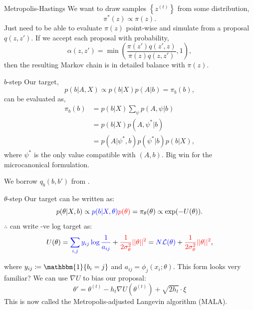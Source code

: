 \documentclass{beamer}
\newcommand{\Lcal}{\mathcal{L}}
\newcommand{\one}{\mathbbm{1}}
\begin{document}
	\begin{frame}{Metropolis-Hastings \cite{hastings-alg}}
		We want to draw samples $\left\{ z^{(t)} \right\}$ from some distribution,
		$$\pi^*(z) \propto \pi(z).$$
		Just need to be able to evaluate $\pi(z)$ point-wise and simulate from a proposal $q(z, z')$. If we accept each proposal with probability,
		$$\alpha(z, z') = \min \left( \frac{\pi(z') q(z', z)}{\pi(z) q(z, z')} , 1 \right),$$
		then the resulting Markov chain is in detailed balance with $\pi(z)$.
	\end{frame}
	
	\begin{frame}{$b$-step}
		Our target,
		$$p(b | A, X) \propto p(b | X) p(A | b) = \pi_b(b),$$
		can be evaluated as,
		\begin{align*}
			\pi_b(b) &= p(b|X) \sum_{\psi} p(A, \psi|b) \\
			&= p(b|X) p(A, \psi^* | b) \\
			&= p(A|\psi^*, b) p(\psi^*|b) p(b | X),
		\end{align*}
		where $\psi^*$ is the only value compatible with $(A,b)$. Big win for the microcanonical formulation.
		
		We borrow $q_b(b, b')$ from \citet{Peixoto-Bayesian-Microcanonical}.
	\end{frame}
	
	\begin{frame}{$\theta$-step}
		Our target can be written as:
		$$p(\theta | X, b) \propto
		{\color{blue} p(b |X, \theta)} 
		{\color{red}p(\theta)}
		= \pi_\theta(\theta) \propto \exp(-U(\theta)).$$
		$\therefore$ can write -ve log target as:
		$$U(\theta) 
		= {\color{blue} \sum_{i,j} y_{ij} \log \frac{1}{a_{ij}} } + 
		{\color{red} \frac{1}{2\sigma_\theta^2} || \theta ||^2} 
		= {\color{blue} N \Lcal(\theta)} 
		+ {\color{red} \frac{1}{2\sigma_\theta^2} ||\theta||^2 },$$
		
		where $y_{ij} \coloneqq \one \{b_i = j\}$ and $a_{ij} = \phi_{j}(x_i; \theta)$. This form looks very familiar? We can use $\nabla U$ to bias our proposal:
		$$\theta' = \theta^{(t)} - h_t \nabla U \left(\theta^{(t)} \right) + \sqrt{2h_t} \cdot \xi$$
		This is now called the Metropolis-adjusted Langevin algorithm (MALA).
	\end{frame}
	
\end{document}
